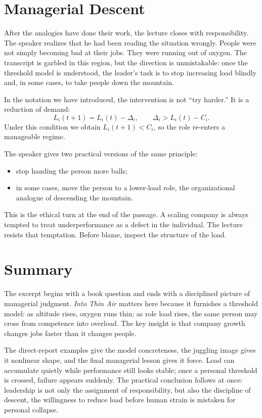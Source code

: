 \section{Managerial Descent}

After the analogies have done their work, the lecture closes with responsibility. The speaker realizes that he had been reading the situation wrongly. People were not simply becoming bad at their jobs. They were running out of oxygen. The transcript is garbled in this region, but the direction is unmistakable: once the threshold model is understood, the leader's task is to stop increasing load blindly and, in some cases, to take people down the mountain.

In the notation we have introduced, the intervention is not ``try harder.'' It is a reduction of demand:
\begin{equation}
L_i(t+1)=L_i(t)-\Delta_i,
\qquad
\Delta_i > L_i(t)-C_i.
\end{equation}
Under this condition we obtain \(L_i(t+1)<C_i\), so the role re-enters a manageable regime.

The speaker gives two practical versions of the same principle:
\begin{itemize}
\item stop handing the person more balls;
\item in some cases, move the person to a lower-load role, the organizational analogue of descending the mountain.
\end{itemize}

This is the ethical turn at the end of the passage. A scaling company is always tempted to treat underperformance as a defect in the individual. The lecture resists that temptation. Before blame, inspect the structure of the load.

\section{Summary}

The excerpt begins with a book question and ends with a disciplined picture of managerial judgment. \emph{Into Thin Air} matters here because it furnishes a threshold model: as altitude rises, oxygen runs thin; as role load rises, the same person may cross from competence into overload. The key insight is that company growth changes jobs faster than it changes people.

The direct-report examples give the model concreteness, the juggling image gives it nonlinear shape, and the final managerial lesson gives it force. Load can accumulate quietly while performance still looks stable; once a personal threshold is crossed, failure appears suddenly. The practical conclusion follows at once: leadership is not only the assignment of responsibility, but also the discipline of descent, the willingness to reduce load before human strain is mistaken for personal collapse.